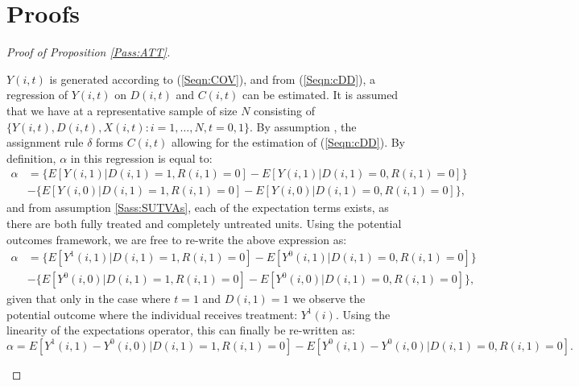 \section{Proofs}
\label{Sscn:proofs}
\begin{proof}[Proof of Proposition \ref{Pass:ATT}]
\begin{footnotesize}
$Y(i,t)$ is generated according to (\ref{Seqn:COV}), and from (\ref{Seqn:cDD}),
a regression of $Y(i,t)$ on $D(i,t)$ and $C(i,t)$ can be estimated.  It is 
assumed that we have at a representative sample of size $N$ consisting of 
$\{Y(i,t),D(i,t),X(i,t): i=1, \ldots, N, t=0, 1\}$.  By assumption 
, the assignment rule $\delta$ forms $C(i,t)$ allowing for 
the estimation of (\ref{Seqn:cDD}). By definition, $\alpha$ in this regression 
is equal to:
\begin{equation}
\nonumber
\label{Seqn:alphaProof1}
\begin{split}
\alpha&=\{E[Y(i,1)|D(i,1)=1,R(i,1)=0]-E[Y(i,1)|D(i,1)=0,R(i,1)=0]\} \\
      &-\{E[Y(i,0)|D(i,1)=1,R(i,1)=0]-E[Y(i,0)|D(i,1)=0,R(i,1)=0]\},
\end{split}
\end{equation}
and from assumption \ref{Sass:SUTVAs}, each of the expectation terms exists, as 
there are both fully treated and completely untreated units. Using the potential 
outcomes framework, we are free to re-write the above expression as:
\begin{equation}
\nonumber
\label{Seqn:alphaProof2}
\begin{split}
\alpha&=\{E[Y^1(i,1)|D(i,1)=1,R(i,1)=0]-E[Y^0(i,1)|D(i,1)=0,R(i,1)=0]\} \\
      &-\{E[Y^0(i,0)|D(i,1)=1,R(i,1)=0]-E[Y^0(i,0)|D(i,1)=0,R(i,1)=0]\},
\end{split}
\end{equation}
given that only in the case where $t=1$ and $D(i,1)=1$ we observe the potential 
outcome where the individual receives treatment: $Y^1(i)$.  Using the linearity
of the expectations operator, this can finally be re-written as:
\begin{equation}
\nonumber
\label{Seqn:alphaProof3}
\alpha=E[Y^1(i,1)-Y^0(i,0)|D(i,1)=1,R(i,1)=0] - 
       E[Y^0(i,1)-Y^0(i,0)|D(i,1)=0,R(i,1)=0].
\end{equation}


\end{footnotesize}
\end{proof}
